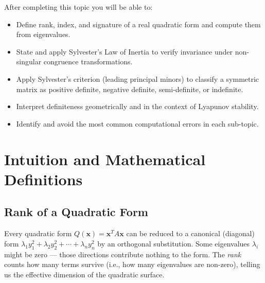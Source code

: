 \documentclass[12pt,a4paper]{article}
\begin{document}
\bigskip
\begin{learnbox}
After completing this topic you will be able to:
\begin{itemize}[noitemsep]
  \item Define rank, index, and signature of a real quadratic form and compute them
        from eigenvalues.
  \item State and apply Sylvester's Law of Inertia to verify invariance under
        non-singular congruence transformations.
  \item Apply Sylvester's criterion (leading principal minors) to classify a symmetric
        matrix as positive definite, negative definite, semi-definite, or indefinite.
  \item Interpret definiteness geometrically and in the context of Lyapunov stability.
  \item Identify and avoid the most common computational errors in each sub-topic.
\end{itemize}
\end{learnbox}

\section{Intuition and Mathematical Definitions}

\subsection{Rank of a Quadratic Form}

Every quadratic form \(Q(\mathbf{x}) = \mathbf{x}^{T} A \mathbf{x}\) can be reduced to a
canonical (diagonal) form \(\lambda_1 y_1^2 + \lambda_2 y_2^2 + \cdots + \lambda_n y_n^2\)
by an orthogonal substitution. Some eigenvalues \(\lambda_i\) might be zero --- those
directions contribute nothing to the form. The \emph{rank} counts how many terms survive
(i.e., how many eigenvalues are non-zero), telling us the effective dimension of the quadratic
surface.
\end{document}
